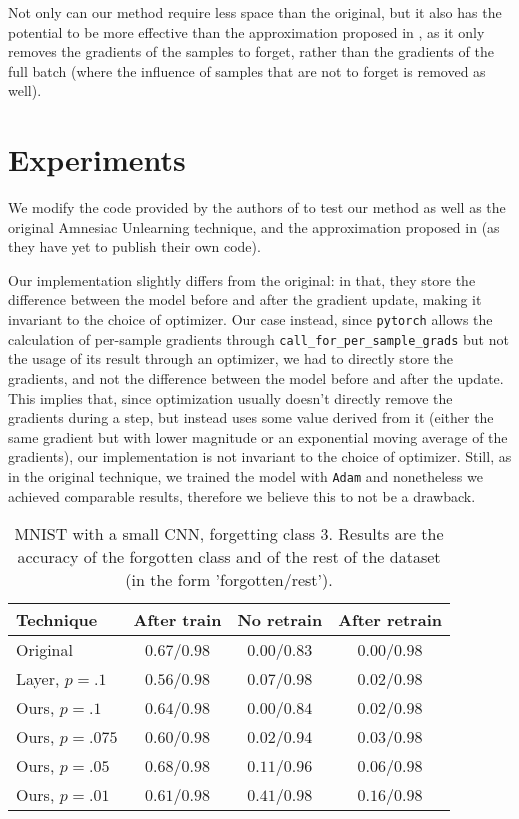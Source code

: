 \documentclass{article}
\begin{document}
Not only can our method require less space than the original, but it also has the potential to be more effective than the approximation proposed in \cite{gogineni2024efficient}, as it only removes the gradients of the samples to forget, rather than the gradients of the full batch (where the influence of samples that are not to forget is removed as well).

\section{Experiments} We modify the code provided by the authors of \cite{graves2021amnesiac} to test our method as well as the original Amnesiac Unlearning technique, and the approximation proposed in \cite{gogineni2024efficient} (as they have yet to publish their own code).

Our implementation slightly differs from the original: in that, they store the difference between the model before and after the gradient update, making it invariant to the choice of optimizer. Our case instead, since \texttt{pytorch} allows the calculation of per-sample gradients through \texttt{call\_for\_per\_sample\_grads} but not the usage of its result through an optimizer, we had to directly store the gradients, and not the difference between the model before and after the update. This implies that, since optimization usually doesn't directly remove the gradients during a step, but instead uses some value derived from it (either the same gradient but with lower magnitude or an exponential moving average of the gradients), our implementation is not invariant to the choice of optimizer. Still, as in the original technique, we trained the model with \texttt{Adam} and nonetheless we achieved comparable results, therefore we believe this to not be a drawback. 

\begin{table}
\centering
\caption{MNIST with a small CNN, forgetting class $3$. Results are the accuracy of the forgotten class and of the rest of the dataset (in the form 'forgotten/rest').}
\label{tab:mnist_small_cnn}
\begin{tabular}{l | c | c c}
    Technique&After train&No retrain&After retrain\\
    \hline
    Original&$0.67$/$0.98$& $0.00$/$0.83$& $0.00$/$0.98$\\
    Layer, $p=.1$&$0.56$/$0.98$& $0.07$/$0.98$& $0.02$/$0.98$\\
    \hline
    Ours, $p=.1$&$0.64$/$0.98$& $0.00$/$0.84$& $0.02$/$0.98$\\
    Ours, $p=.075$&$0.60$/$0.98$&$0.02$/$0.94$& $0.03$/$0.98$\\
    Ours, $p=.05$&$0.68$/$0.98$&$0.11$/$0.96$&$0.06$/$0.98$\\
    Ours, $p=.01$&$0.61$/$0.98$&$0.41$/$0.98$&$0.16$/$0.98$\\
\end{tabular}
\end{table}
\end{document}
